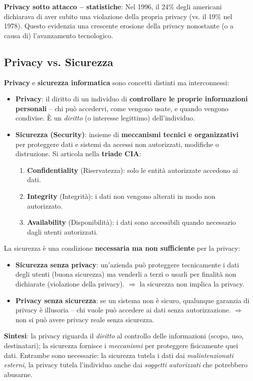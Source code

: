 \documentclass[a4paper,11pt]{article}
\begin{document}
\textbf{Privacy sotto attacco -- statistiche}: Nel 1996, il 24\% degli americani dichiarava di aver subito una violazione della propria privacy (vs. il 19\% nel 1978). Questo evidenzia una crescente erosione della privacy nonostante (o a causa di) l'avanzamento tecnologico.

\subsection{Privacy vs. Sicurezza}

\begin{definizione}
\textbf{Privacy} e \textbf{sicurezza informatica} sono concetti distinti ma interconnessi:

\begin{itemize}
  \item \textbf{Privacy}: il diritto di un individuo di \textbf{controllare le proprie informazioni personali} -- chi può accedervi, come vengono usate, e quando vengono condivise. È un \emph{diritto} (o interesse legittimo) dell'individuo.
  \item \textbf{Sicurezza (Security)}: insieme di \textbf{meccanismi tecnici e organizzativi} per proteggere dati e sistemi da accessi non autorizzati, modifiche o distruzione. Si articola nella \textbf{triade CIA}:
  \begin{enumerate}
    \item \textbf{Confidentiality} (Riservatezza): solo le entità autorizzate accedono ai dati.
    \item \textbf{Integrity} (Integrità): i dati non vengono alterati in modo non autorizzato.
    \item \textbf{Availability} (Disponibilità): i dati sono accessibili quando necessario dagli utenti autorizzati.
  \end{enumerate}
\end{itemize}
\end{definizione}

\begin{nota}
La sicurezza è una condizione \textbf{necessaria ma non sufficiente} per la privacy:
\begin{itemize}
  \item \textbf{Sicurezza senza privacy}: un'azienda può proteggere tecnicamente i dati degli utenti (buona sicurezza) ma venderli a terzi o usarli per finalità non dichiarate (violazione della privacy). $\Rightarrow$ la sicurezza non implica la privacy.
  \item \textbf{Privacy senza sicurezza}: se un sistema non è sicuro, qualunque garanzia di privacy è illusoria -- chi vuole può accedere ai dati senza autorizzazione. $\Rightarrow$ non si può avere privacy reale senza sicurezza.
\end{itemize}
\textbf{Sintesi}: la privacy riguarda il \emph{diritto} al controllo delle informazioni (scopo, uso, destinatari); la sicurezza fornisce i \emph{meccanismi} per proteggere fisicamente quei dati. Entrambe sono necessarie: la sicurezza tutela i dati dai \emph{malintenzionati esterni}, la privacy tutela l'individuo anche dai \emph{soggetti autorizzati} che potrebbero abusarne.
\end{nota}
\end{document}
